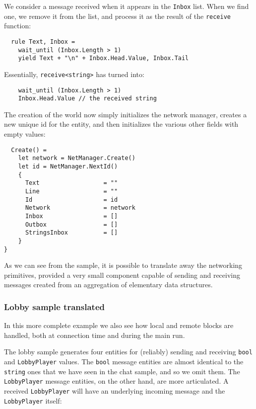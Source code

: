 We consider a message received when it appears in the \texttt{Inbox} list. When we find one, we remove it from the list, and process it as the result of the \texttt{receive} function:

\begin{lstlisting}
  rule Text, Inbox =
    wait_until (Inbox.Length > 1)
    yield Text + "\n" + Inbox.Head.Value, Inbox.Tail
\end{lstlisting}

Essentially, \texttt{receive<string>} has turned into:

\begin{lstlisting}
    wait_until (Inbox.Length > 1)
    Inbox.Head.Value // the received string
\end{lstlisting}

The creation of the world now simply initializes the network manager, creates a new unique id for the entity, and then initializes the various other fields with empty values:

\begin{lstlisting}
  Create() =
    let network = NetManager.Create()
    let id = NetManager.NextId()
    {
      Text                  = ""
      Line                  = ""
      Id                    = id
      Network               = network
      Inbox                 = []
      Outbox                = []
      StringsInbox          = []
    }
}
\end{lstlisting}

As we can see from the sample, it is possible to translate away the networking primitives, provided a very small component capable of sending and receiving messages created from an aggregation of elementary data structures.

\subsubsection{Lobby sample translated}
In this more complete example we also see how local and remote blocks are handled, both at connection time and during the main run.

The lobby sample generates four entities for (reliably) sending and receiving \texttt{bool} and \texttt{LobbyPlayer} values. The \texttt{bool} message entities are almost identical to the \texttt{string} ones that we have seen in the chat sample, and so we omit them. The \texttt{LobbyPlayer} message entities, on the other hand, are more articulated. A received \texttt{LobbyPlayer} will have an underlying incoming message and the \texttt{LobbyPlayer} itself:

